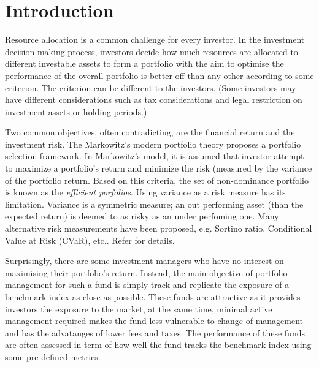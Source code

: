 \chapter{Introduction}
\graphicspath{{Chapter1/figures/}}
\label{Introduction}
Resource allocation is a common challenge for every investor. In the investment decision making process, investors decide how much resources are allocated to different investable assets to form a portfolio with the aim to optimise the performance of the overall portfolio is better off than any other according to some criterion. The criterion can be different to the investors. (Some investors may have different considerations such as tax considerations and legal restriction on investment assets or holding periods.)

Two common objectives, often contradicting, are the financial return and the investment risk. The Markowitz's modern portfolio theory \cite{HM52} proposes a portfolio selection framework. In Markowitz's model, it is assumed that investor attempt to maximize a portfolio's return and minimize the risk (measured by the variance of the portfolio return. Based on this criteria, the set of non-dominance portfolio is known as the \emph{efficient porfolios}. Using variance as a risk measure has its limitation. Variance is a symmetric measure; an out performing asset (than the expected return) is deemed to as risky as an under perfoming one. Many alternative risk measurements have been proposed, e.g. Sortino ratio, Conditional Value at Risk (CVaR), etc.. Refer \cite{RTR00} for details.


Surprisingly, there are some investment managers who have no interest on maximising their portfolio's return. Instead, the main objective of portfolio management for such a fund is simply track and replicate the exposure of a benchmark index as close as possible. These funds are attractive as it provides investors the exposure to the market, at the same time, minimal active management required makes the fund less vulnerable to change of management and has the advatanges of lower fees and taxes. The performance of these funds are often assessed in term of how well the fund tracks the benchmark index using some pre-defined metrics.

